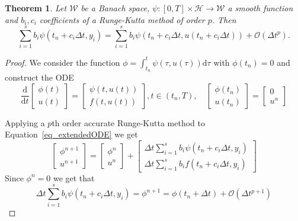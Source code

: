 \documentclass{article}
\newtheorem{theorem}{Theorem}[section]
\begin{document}
    \begin{theorem}\label{Th_psi}
        Let \(\mathcal{W}\) be a Banach space, \(\psi: \left[0,T\right]\times \mathcal{H} \rightarrow \mathcal{W}\) a smooth function and \(b_i, c_i\) coefficients of a Runge-Kutta method of order \(p\). Then
        \[\sum_{i=1}^s b_i\psi(t_n + c_i \Delta t, y_i) = \sum_{i=1}^{s}b_i\psi(t_n + c_i \Delta t, u(t_n + c_i \Delta t)) + \mathcal{O}(\Delta t^p).\]
    \end{theorem}
    \begin{proof}
        We consider the function \(\phi = \int_{t_n}^t \psi(\tau, u(\tau)) \text{d}\tau\) with \(\phi(t_n) = 0\) and construct the ODE
        \begin{equation}\label{eq_extendedODE}
            \frac{\text{d}}{\text{d}t}
            \begin{bmatrix}
                \phi(t)\\
                u(t)
            \end{bmatrix} =
            \begin{bmatrix}
                \psi(t, u(t))\\
                f(t,u(t))
            \end{bmatrix}, t\in(t_n, T), \quad
            \begin{bmatrix}
                \phi(t_n)\\
                u(t_n)
            \end{bmatrix}=
            \begin{bmatrix}
                0\\
                u^n
            \end{bmatrix}
        \end{equation}

    Applying a \(p\)th order accurate Runge-Kutta method to Equation~\ref{eq_extendedODE} we get
    \[
    \begin{bmatrix}
        \phi^{n+1}\\
        u^{n+1}
    \end{bmatrix} =
    \begin{bmatrix}
        \phi^{n}\\
        u^{n}
    \end{bmatrix} +
    \begin{bmatrix}
        \Delta t \sum_{i=1}^{s}b_i\psi(t_n + c_i \Delta t, y_i)\\
        \Delta t \sum_{i=1}^{s}b_if(t_n + c_i \Delta t, y_i)
    \end{bmatrix}
        \]
    Since \(\phi^n=0\) we get that
    \begin{equation}\label{Eq_psi_proof_1}
        \Delta t \sum_{i=1}^{s}b_i\psi(t_n + c_i \Delta t, y_i) = \phi^{n+1} = \phi(t_n + \Delta t) + \mathcal{O}(\Delta t^{p+1})
    \end{equation}


\end{proof}
\end{document}
